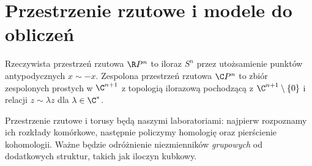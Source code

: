 \section{Przestrzenie rzutowe i modele do obliczeń}

\begin{definicja}
Rzeczywista przestrzeń rzutowa $\R P^n$ to iloraz $S^n$ przez
utożsamienie punktów antypodycznych $x\sim-x$.
Zespolona przestrzeń rzutowa $\C P^n$ to zbiór zespolonych prostych
w $\C^{n+1}$ z topologią ilorazową pochodzącą z
$\C^{n+1}\setminus\{0\}$ i relacji $z\sim\lambda z$ dla $\lambda\in\C^*$.
\end{definicja}

\begin{uwaga}
Przestrzenie rzutowe i torusy będą naszymi laboratoriami: najpierw
rozpoznamy ich rozkłady komórkowe, następnie policzymy homologię oraz
pierścienie kohomologii. Ważne będzie odróżnienie niezmienników
\emph{grupowych} od dodatkowych struktur, takich jak iloczyn kubkowy.
\end{uwaga}

